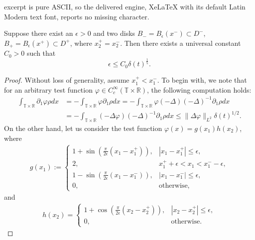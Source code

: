 \documentclass[10pt,a4paper]{amsart}
\newcommand{\R}{\mathbb{R}}
\newcommand{\T}{\mathbb{T}}
\newcommand{\eps}{\epsilon}
\newcommand{\p}{\partial}
\begin{document}
excerpt is pure ASCII, so the delivered engine, XeLaTeX with its default Latin Modern text font, reports no missing character.
\begin{lem}\label{lem:h-2}
    Suppose there exist an $\eps > 0$ and two disks $B_- = B_\epsilon (x^-) \subset D^-$, $B_+ = B_\eps (x^+) \subset D^+$, where $x_2^+ = x_2^-$. Then there exists a universal constant $C_0 > 0$ such that
    \begin{equation}
        \label{est:radiusbd}
        \eps \le C_0\delta(t)^{\frac15}.
    \end{equation}
\end{lem}

\begin{proof}
    Without loss of generality, assume $x_1^+ < x_1^-$. To begin with, we note that for an arbitrary test function $\varphi \in C^\infty_c (\T \times \R)$, the following computation holds:
    \begin{equation}\label{radbdaux1}
    \begin{split}
        \int_{\T \times \R} \p_1 \varphi \rho dx &= -\int_{\T \times \R} \varphi \p_1\rho dx = -\int_{\T \times \R} \varphi (-\Delta)(-\Delta)^{-1}\p_1 \rho dx\\
        &= -\int_{\T \times \R} (-\Delta \varphi)(-\Delta)^{-1}\p_1 \rho dx \le \|\Delta \varphi\|_{L^2}\delta(t)^{1/2}.
        \end{split}
    \end{equation}
    On the other hand, let us consider the test function $\varphi(x) = g(x_1)h(x_2)$, where
    \begin{align*}
    g(x_1) :=\begin{cases}
        1+ \sin\left(\frac{\pi}{2\eps}(x_1 - x_1^+)\right),& |x_1 - x_1^+| \le \eps,\\
        2,& x_1^+ + \eps < x_1 < x_1^- - \eps,\\
        1 - \sin\left(\frac{\pi}{2\eps}(x_1 - x_1^-)\right),& |x_1 - x_1^-| \le \eps,\\
        0,& \text{otherwise},
    \end{cases}
    \end{align*}
    and
    \begin{align*}
    h(x_2) = \begin{cases}
    1 + \cos\left(\frac{\pi}{2\eps}(x_2 - x_2^+)\right),& |x_2 - x_2^+| \le \eps,\\
    0,& \text{otherwise}.
    \end{cases}
    \end{align*}

\end{proof}
\end{document}
